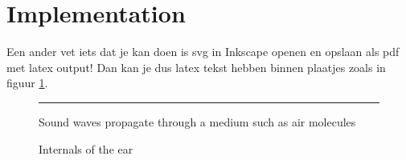 \section{Implementation}

Een ander vet iets dat je kan doen is svg in Inkscape openen en opslaan als pdf met latex output! Dan kan je dus latex tekst hebben binnen plaatjes zoals in figuur \ref{fig:humanear}.

\begin{figure}
\hhrule \vspace{0.5\baselineskip}
\null\hfill\parbox[b]{0.45\linewidth}{%
\centering
\def\svgwidth{\linewidth}
{\footnotesize
}
}\hfill
\parbox[b]{0.45\linewidth}{%
\centering
\def\svgwidth{\linewidth}
{\footnotesize
}
}\hfill\null
\vspace{0.5\baselineskip}\hrule
\null\hfill\parbox[t]{0.45\linewidth}{%
\caption[Propagating sound waves]{Sound waves propagate through a medium such as air molecules} \label{fig:waveform}
}\hfill
\parbox[t]{0.45\linewidth}{%
\caption{Internals of the ear} \label{fig:humanear}
}\hfill\null
\hhrule
\end{figure}